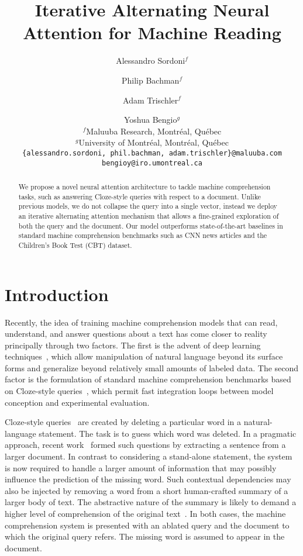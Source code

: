\documentclass[11pt]{article}
\author{Alessandro Sordoni$^f$ \and Philip Bachman$^f$ \and Adam Trischler$^f$ \and Yoshua Bengio$^g$ \\
$^f$Maluuba Research, Montr\'eal, Qu\'ebec \\
$^g$University of Montr\'eal, Montr\'eal, Qu\'ebec \\
\small \tt \{alessandro.sordoni, phil.bachman, adam.trischler\}@maluuba.com \\
\small \tt bengioy@iro.umontreal.ca}
\title{Iterative Alternating Neural Attention for Machine Reading}
\begin{document}
\maketitle
\begin{abstract}
We propose a novel neural attention architecture to tackle machine comprehension tasks, such as answering Cloze-style queries with respect to a document. Unlike previous models, we do not collapse the query into a single vector, instead we deploy an iterative alternating attention mechanism that allows a fine-grained exploration of both the query and the document. Our model outperforms state-of-the-art baselines in standard machine comprehension benchmarks such as CNN news articles and the Children's Book Test (CBT) dataset.

\end{abstract}

\section{Introduction}








Recently, the idea of training machine comprehension models that can read, understand, and answer questions about a text has come closer to reality principally through two factors.  The first is the advent of deep learning techniques~\cite{bengio_book}, which allow manipulation of natural language beyond its surface forms and generalize beyond relatively small amounts of labeled data.  The second factor is the formulation of standard machine comprehension benchmarks based on Cloze-style queries~\cite{hill2015goldilocks,hermann2015teaching}, which permit fast integration loops between model conception and experimental evaluation.

Cloze-style queries~\cite{taylor1953} are created by deleting a particular word in a natural-language statement. The task is to guess which word was deleted. In a pragmatic approach, recent work~\cite{hill2015goldilocks} formed such questions by extracting a sentence from a larger document. In contrast to considering a stand-alone statement, the system is now required to handle a larger amount of information that may possibly influence the prediction of the missing word. Such contextual dependencies may also be injected by removing a word from a short human-crafted summary of a larger body of text. The abstractive nature of the summary is likely to demand a higher level of comprehension of the original text~\cite{hermann2015teaching}. In both cases, the machine comprehension system is presented with an ablated query and the document to which the original query refers. The missing word is assumed to appear in the document.
\end{document}
